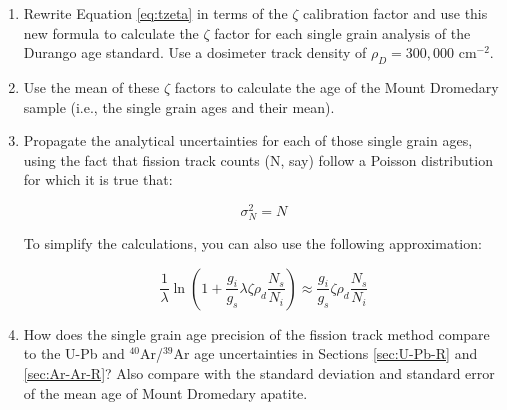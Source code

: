 \documentclass{book}
\begin{document}
\begin{enumerate} 

\item Rewrite Equation \ref{eq:tzeta} in terms of the $\zeta$
  calibration factor and use this new formula to calculate the $\zeta$
  factor for each single grain analysis of the Durango age standard.
  Use a dosimeter track density of $\rho_D = 300,000$ cm$^{-2}$.
\item Use the mean of these $\zeta$ factors to calculate the age of
  the Mount Dromedary sample (i.e., the single grain ages and their
  mean).
\item Propagate the analytical uncertainties for each of those single
  grain ages, using the fact that fission track counts (N, say) follow
  a Poisson distribution for which it is true that:

$$\sigma^2_N = N$$

To simplify the calculations, you can also use the following
approximation:

$$\frac{1}{\lambda}\ln\left(1+\frac{g_i}{g_s}\lambda\zeta\rho_d\frac{N_s}{N_i}\right)
\approx \frac{g_i}{g_s}\zeta\rho_d\frac{N_s}{N_i}$$

\item How does the single grain age precision of the fission track
  method compare to the U-Pb and $^{40}$Ar/$^{39}$Ar age uncertainties
  in Sections \ref{sec:U-Pb-R} and \ref{sec:Ar-Ar-R}? Also compare
  with the standard deviation and standard error of the mean age of
  Mount Dromedary apatite.

\end{enumerate}

\newpage\pagestyle{empty}~
\newpage\pagestyle{empty}~
\end{document}
